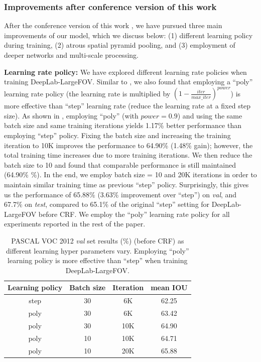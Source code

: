 \subsubsection{Improvements after conference version of this work}
After the conference version of this work \cite{chen2014semantic}, we have
pursued three main improvements of our model, which we discuss below:
(1) different learning policy during training, (2) atrous spatial pyramid
pooling, and (3) employment of deeper networks and multi-scale processing.

\textbf{Learning rate policy:} We have explored different learning rate
policies when training DeepLab-LargeFOV. Similar to \cite{liu2015parsenet},
we also found that employing a ``poly'' learning rate policy (the learning
rate is multiplied by $(1-\frac{iter}{max\_iter})^{power}$) is more effective
than ``step'' learning rate (reduce the learning rate at a fixed step size).
As shown in , employing ``poly'' (with $power = 0.9$)
and using the same batch size and same training iterations yields 1.17\% better
performance than employing ``step'' policy. Fixing the batch size and increasing
the training iteration to 10K improves the performance to 64.90\% (1.48\% gain);
however, the total training time increases due to more training iterations. We
then reduce the batch size to 10 and found that comparable performance is still
maintained (64.90\% \%). In the end, we employ batch size = 10 and
20K iterations in order to maintain similar training time as previous ``step''
policy. Surprisingly, this gives us the performance of 65.88\% (3.63\%
improvement over ``step'') on \textit{val}, and 67.7\% on \textit{test},
compared to 65.1\% of the original ``step'' setting for DeepLab-LargeFOV before
CRF. We employ the ``poly'' learning rate policy for all experiments reported in
the rest of the paper.

\begin{table}[!t]
  \centering
  \addtolength{\tabcolsep}{2.5pt}
  \begin{tabular}{c c c c}
    \toprule[0.2 em]
    {\bf Learning policy} & {\bf Batch size} & {\bf Iteration} & {\bf mean IOU} \\
    \toprule[0.2em]
    step & 30 & 6K & 62.25 \\
    \midrule
    poly & 30 & 6K & 63.42 \\
    poly & 30 & 10K & 64.90 \\
    poly & 10 & 10K & 64.71 \\
    poly & 10 & 20K & 65.88 \\
    \bottomrule[0.1em]
  \end{tabular}
  \caption{PASCAL VOC 2012 \textit{val} set results (\%) (before CRF) as
    different learning hyper parameters vary. Employing ``poly'' learning
    policy is more effective than ``step'' when training DeepLab-LargeFOV.}
  \label{tab:val_poly}
\end{table}


